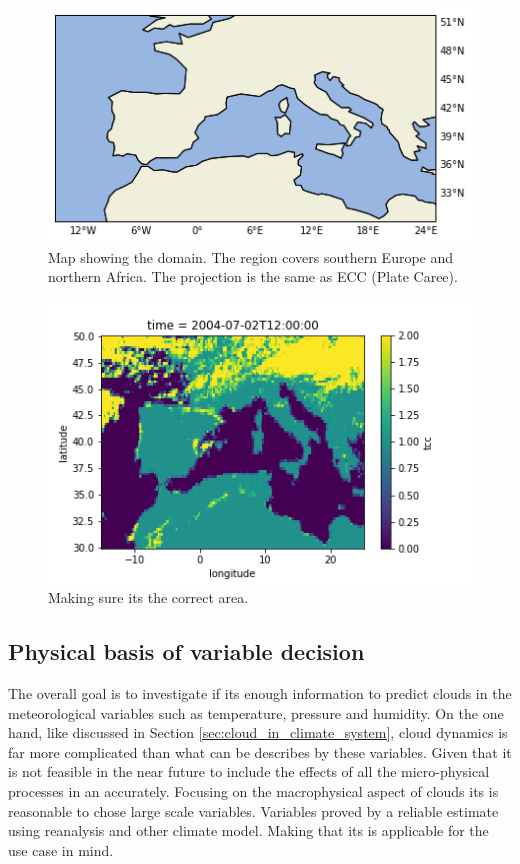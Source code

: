 \begin{figure}[h]
    \centering
    \includegraphics[scale = 0.7]{Chapter4_Results/figurs/Domain.png}
    \caption[Map over domain.]{Map showing the domain. The region covers southern Europe and northern Africa. The projection is the same as ECC (Plate Caree).}
    \label{fig:map}
\end{figure}

\begin{figure}
    \centering
    \includegraphics{Chapter4_Results/figurs/regridded_raw_satelite_image_to_make_sure_its_correcxt_area.png}
    \caption{Making sure its the correct area.}
    \label{fig:correct_area}
\end{figure}

\subsection{Physical basis of variable decision} \label{sec:ecc}
The overall goal is to investigate if its enough information to predict clouds in the meteorological variables such as temperature, pressure and humidity. On the one hand, like discussed in Section \ref{sec:cloud_in_climate_system}, cloud dynamics is far more complicated than what can be describes by these variables. Given that it is not feasible in the near future to include the effects of all the micro-physical processes in an accurately. Focusing on the macrophysical aspect of clouds its is reasonable to chose large scale variables.  Variables proved by a reliable estimate using reanalysis and other climate model. Making that its is applicable for the use case in mind.

